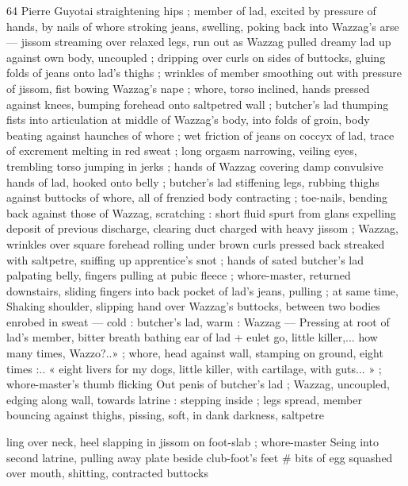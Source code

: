 64 Pierre Guyotai
straightening hips ; member of lad, excited by pressure of hands, by
nails of whore stroking jeans, swelling, poking back into Wazzag's
arse — jissom streaming over relaxed legs, run out as Wazzag pulled
dreamy lad up against own body, uncoupled ; dripping over curls on
sides of buttocks, gluing folds of jeans onto lad’s thighs ; wrinkles
of member smoothing out with pressure of jissom, fist bowing
Wazzag's nape ; whore, torso inclined, hands pressed against knees,
bumping forehead onto saltpetred wall ; butcher's lad thumping fists
into articulation at middle of Wazzag’s body, into folds of groin, body
beating against haunches of whore ; wet friction of jeans on coccyx
of lad, trace of excrement melting in red sweat ; long orgasm
narrowing, veiling eyes, trembling torso jumping in jerks ; hands of
Wazzag covering damp convulsive hands of lad, hooked onto belly ;
butcher's lad stiffening legs, rubbing thighs against buttocks of
whore, all of frenzied body contracting ; toe-nails, bending back
against those of Wazzag, scratching : short fluid spurt from glans
expelling deposit of previous discharge, clearing duct charged with
heavy jissom ; Wazzag, wrinkles over square forehead rolling under
brown curls pressed back streaked with saltpetre, sniffing up
apprentice’s snot ; hands of sated butcher's lad palpating belly,
fingers pulling at pubic fleece ; whore-master, returned downstairs,
sliding fingers into back pocket of lad’s jeans, pulling ; at same time,
Shaking shoulder, slipping hand over Wazzag's buttocks, between
two bodies enrobed in sweat — cold : butcher's lad, warm : Wazzag
— Pressing at root of lad's member, bitter breath bathing ear of lad
+ eulet go, little killer,... how many times, Wazzo?..» ; whore, head
against wall, stamping on ground, eight times :.. « eight livers for my
dogs, little killer, with cartilage, with guts... » ; whore-master's thumb
flicking Out penis of butcher's lad ; Wazzag, uncoupled, edging along
wall, towards latrine : stepping inside ; legs spread, member
bouncing against thighs, pissing, soft, in dank darkness, saltpetre

ling over neck, heel slapping in jissom on foot-slab ; whore-master
Seing into second latrine, pulling away plate beside club-foot's feet
# bits of egg squashed over mouth, shitting, contracted buttocks

